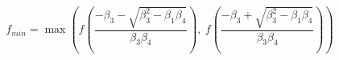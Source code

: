

\[
f_{min} = \max \left(
f \left( \frac{-\beta_3-\sqrt{\beta_3^2-\beta_1\beta_4}}{\beta_3\beta_4} \right), \ 
f \left( \frac{-\beta_3+\sqrt{\beta_3^2-\beta_1\beta_4}}{\beta_3\beta_4} \right)
\right)
\]


